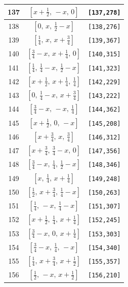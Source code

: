 \documentclass[fleqn,8pt]{jsarticle}
\begin{document}
\begin{longtable}{ccc}
137 & $\left[ x + \frac{1}{2},\, - x,\, 0 \right]$ & {\tt [137,278]} \\ \hline
138 & $\left[ 0,\, x,\, \frac{1}{2} - x \right]$ & {\tt [138,276]} \\ \hline
139 & $\left[ \frac{1}{4},\, x,\, x + \frac{3}{4} \right]$ & {\tt [139,367]} \\ \hline
140 & $\left[ \frac{3}{4} - x,\, x + \frac{1}{4},\, 0 \right]$ & {\tt [140,315]} \\ \hline
141 & $\left[ \frac{1}{4},\, \frac{1}{4} - x,\, \frac{1}{2} - x \right]$ & {\tt [141,323]} \\ \hline
142 & $\left[ x + \frac{1}{2},\, x + \frac{1}{4},\, \frac{1}{4} \right]$ & {\tt [142,229]} \\ \hline
143 & $\left[ 0,\, \frac{1}{4} - x,\, x + \frac{3}{4} \right]$ & {\tt [143,222]} \\ \hline
144 & $\left[ \frac{3}{4} - x,\, - x,\, \frac{1}{4} \right]$ & {\tt [144,362]} \\ \hline
145 & $\left[ x + \frac{1}{2},\, 0,\, - x \right]$ & {\tt [145,208]} \\ \hline
146 & $\left[ x + \frac{3}{4},\, x,\, \frac{3}{4} \right]$ & {\tt [146,312]} \\ \hline
147 & $\left[ x + \frac{3}{4},\, \frac{3}{4} - x,\, 0 \right]$ & {\tt [147,356]} \\ \hline
148 & $\left[ \frac{3}{4} - x,\, \frac{1}{4},\, \frac{1}{2} - x \right]$ & {\tt [148,346]} \\ \hline
149 & $\left[ x,\, \frac{1}{4},\, x + \frac{1}{4} \right]$ & {\tt [149,248]} \\ \hline
150 & $\left[ \frac{1}{2},\, x + \frac{3}{4},\, \frac{1}{4} - x \right]$ & {\tt [150,263]} \\ \hline
151 & $\left[ \frac{1}{4},\, - x,\, \frac{1}{4} - x \right]$ & {\tt [151,307]} \\ \hline
152 & $\left[ x + \frac{1}{2},\, \frac{1}{4},\, x + \frac{1}{4} \right]$ & {\tt [152,245]} \\ \hline
153 & $\left[ \frac{3}{4} - x,\, 0,\, x + \frac{1}{4} \right]$ & {\tt [153,303]} \\ \hline
154 & $\left[ \frac{3}{4} - x,\, \frac{1}{4},\, - x \right]$ & {\tt [154,340]} \\ \hline
155 & $\left[ \frac{1}{4},\, x + \frac{3}{4},\, x + \frac{1}{2} \right]$ & {\tt [155,357]} \\ \hline
156 & $\left[ \frac{1}{2},\, - x,\, x + \frac{1}{2} \right]$ & {\tt [156,210]} \\ \hline

\end{longtable}
\end{document}
